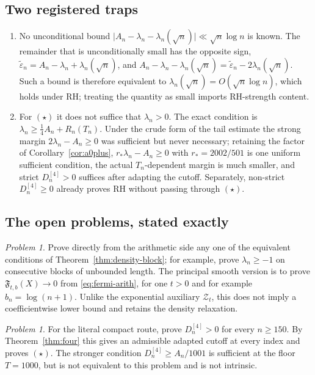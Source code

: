 \documentclass[11pt]{amsart}
\theoremstyle{definition}
\theoremstyle{remark}
\newtheorem{problem}[theorem]{Problem}
\theoremstyle{definition}
\newcommand{\RH}{\mathrm{RH}}
\newcommand{\eps}{\varepsilon}
\begin{document}
\subsection{Two registered traps}

\begin{enumerate}[label=\textup{(T\arabic*)},leftmargin=*]
\item No unconditional bound
      $\bigl|A_n-\lambda_n-\lambda_n(\sqrt n)\bigr|\ll\sqrt n\log n$ is known. The remainder that
      is unconditionally small has the opposite sign, $\widetilde\eps_n=A_n-\lambda_n+\lambda_n(\sqrt n)$,
      and $A_n-\lambda_n-\lambda_n(\sqrt n)=\widetilde\eps_n-2\lambda_n(\sqrt n)$. Such a bound is
      therefore equivalent to $\lambda_n(\sqrt n)=O(\sqrt n\log n)$, which holds under $\RH$;
      treating the quantity as small imports $\RH$-strength content.
\item For $(\star)$ it does not suffice that $\lambda_n>0$. The exact condition is
      $\lambda_n\ge\tfrac14A_n+R_n(T_n)$. Under the crude form of the tail estimate the strong margin
      $2\lambda_n-A_n\ge0$ was sufficient but never necessary; retaining the factor of
      Corollary~\ref{cor:a0plus}, $r_*\lambda_n-A_n\ge0$ with $r_*=2002/501$ is one uniform
      sufficient condition, the actual $T_n$-dependent margin is much smaller, and strict
      $D_n^{[4]}>0$ suffices after adapting the cutoff.  Separately, non-strict
      $D_n^{[4]}\ge0$ already proves RH without passing through $(\star)$.
\end{enumerate}

\subsection{The open problems, stated exactly}

\begin{problem}\label{prob:main}
Prove directly from the arithmetic side any one of the equivalent conditions of
Theorem~\ref{thm:density-block}; for example, prove $\lambda_n\ge-1$ on consecutive blocks of
unbounded length.  The principal smooth version is to prove
$\mathfrak F_{t,b}(X)\to0$ from \eqref{eq:fermi-arith}, for one $t>0$ and for example
$b_n=\log(n+1)$.  Unlike the exponential auxiliary $\mathcal Z_t$, this does not imply a
coefficientwise lower bound and retains the density relaxation.
\end{problem}

\begin{problem}\label{prob:a1-cofinal}
For the literal compact route, prove $D_n^{[4]}>0$ for every $n\ge150$.  By
Theorem~\ref{thm:four} this gives an admissible adapted cutoff at every index and proves
$(\star)$.  The stronger condition $D_n^{[4]}\ge A_n/1001$ is sufficient at the floor
$T=1000$, but is not equivalent to this problem and is not intrinsic.
\end{problem}
\end{document}
